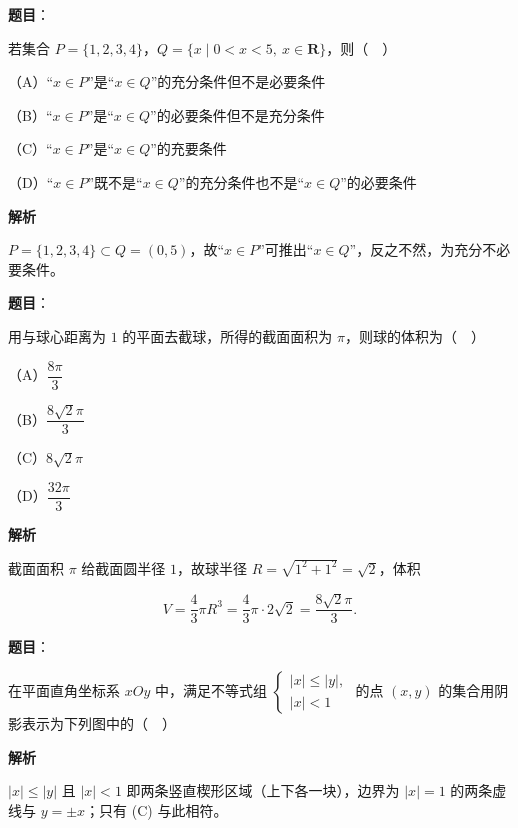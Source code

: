 \begin{answer}

\textbf{题目}：

若集合 $P=\{1,2,3,4\}$，$Q=\{x\mid 0<x<5,\ x\in\mathbf R\}$，则（　）

（A）“$x\in P$”是“$x\in Q$”的充分条件但不是必要条件

（B）“$x\in P$”是“$x\in Q$”的必要条件但不是充分条件

（C）“$x\in P$”是“$x\in Q$”的充要条件

（D）“$x\in P$”既不是“$x\in Q$”的充分条件也不是“$x\in Q$”的必要条件

\textbf{解析}

$P=\{1,2,3,4\}\subset Q=(0,5)$，故“$x\in P$”可推出“$x\in Q$”，反之不然，为充分不必要条件。


\end{answer}
\begin{answer}

\textbf{题目}：

用与球心距离为 $1$ 的平面去截球，所得的截面面积为 $\pi$，则球的体积为（　）

（A）$\dfrac{8\pi}3$

（B）$\dfrac{8\sqrt2\pi}3$

（C）$8\sqrt2\pi$

（D）$\dfrac{32\pi}3$

\textbf{解析}

截面面积 $\pi$ 给截面圆半径 $1$，故球半径 $R=\sqrt{1^2+1^2}=\sqrt2$，体积

\nopagebreak[4]
\[V=\frac43\pi R^3=\frac43\pi\cdot2\sqrt2=\frac{8\sqrt2\pi}3.\]


\end{answer}
\begin{answer}

\textbf{题目}：

在平面直角坐标系 $xOy$ 中，满足不等式组 $\begin{cases}|x|\leqslant|y|,\\ |x|<1\end{cases}$ 的点 $(x,y)$ 的集合用阴影表示为下列图中的（　）
\nopagebreak[4]
\begin{center}\end{center}
\nopagebreak[4]
\textbf{解析}

$|x|\leqslant|y|$ 且 $|x|<1$ 即两条竖直楔形区域（上下各一块），边界为 $|x|=1$ 的两条虚线与 $y=\pm x$；只有 (C) 与此相符。


\end{answer}
